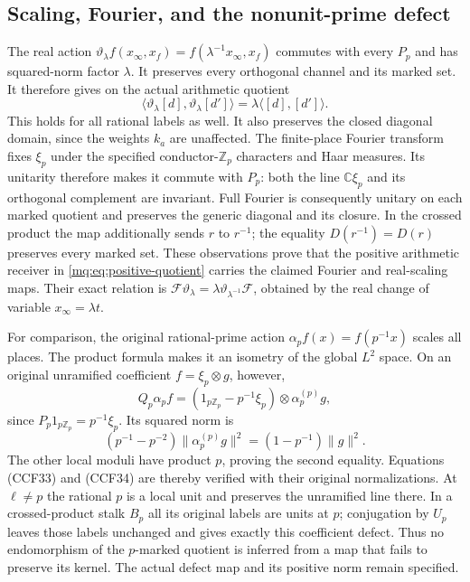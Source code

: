\documentclass[11pt,a4paper]{article}
\theoremstyle{definition}\newtheorem{definition}[theorem]{Definition}
\newcommand{\Z}{\mathbb Z}\newcommand{\Q}{\mathbb Q}
\newcommand{\C}{\mathbb C}\newcommand{\R}{\mathbb R}
\begin{document}
\subsection{Scaling, Fourier, and the nonunit-prime defect}

The real action $\vartheta_\lambda f(x_\infty,x_f)
=f(\lambda^{-1}x_\infty,x_f)$ commutes with every $P_p$ and
has squared-norm factor $\lambda$. It preserves every orthogonal
channel and its marked set. It therefore gives on the actual
arithmetic quotient
\[
 \langle\vartheta_\lambda[d],\vartheta_\lambda[d']\rangle
       =\lambda\langle[d],[d']\rangle.
 \tag{MQ27}\label{mq:eq:scaling}
\]
This holds for all rational labels as well. It also preserves the
closed diagonal domain, since the weights $k_a$ are unaffected.
The finite-place Fourier transform fixes $\xi_p$ under the
specified conductor-$\Z_p$ characters and Haar measures. Its
unitarity therefore makes it commute with $P_p$: both the line
$\C\xi_p$ and its orthogonal complement are invariant. Full
Fourier is consequently unitary on each marked quotient and
preserves the generic diagonal and its closure. In the crossed
product the map additionally sends $r$ to $r^{-1}$; the equality
$D(r^{-1})=D(r)$ preserves every marked set. These observations
prove that the positive arithmetic receiver in
\eqref{mq:eq:positive-quotient} carries the claimed Fourier and
real-scaling maps. Their exact relation is
$\mathcal F\vartheta_\lambda
=\lambda\vartheta_{\lambda^{-1}}\mathcal F$, obtained by the
real change of variable $x_\infty=\lambda t$.

For comparison, the original rational-prime action
$\alpha_pf(x)=f(p^{-1}x)$ scales all places. The product formula
makes it an isometry of the global $L^2$ space. On an original
unramified coefficient $f=\xi_p\otimes g$, however,
\[
 Q_p\alpha_pf=
 (1_{p\Z_p}-p^{-1}\xi_p)\otimes\alpha_p^{(p)}g,
 \tag{MQ28}\label{mq:eq:prime-defect}
\]
since $P_p1_{p\Z_p}=p^{-1}\xi_p$. Its squared norm is
\[
 (p^{-1}-p^{-2})\|\alpha_p^{(p)}g\|^2
       =(1-p^{-1})\|g\|^2.
 \tag{MQ29}\label{mq:eq:defect-norm}
\]
The other local moduli have product $p$, proving the second
equality. Equations (CCF33) and (CCF34) are thereby verified with their original
normalizations. At $\ell\ne p$ the rational $p$ is a local
unit and preserves the unramified line there. In a crossed-product
stalk $B_p$ all its original labels are units at $p$; conjugation
by $U_p$ leaves those labels unchanged and gives exactly this
coefficient defect. Thus no endomorphism of the $p$-marked
quotient is inferred from a map that fails to preserve its kernel.
The actual defect map and its positive norm remain specified.
\end{document}
